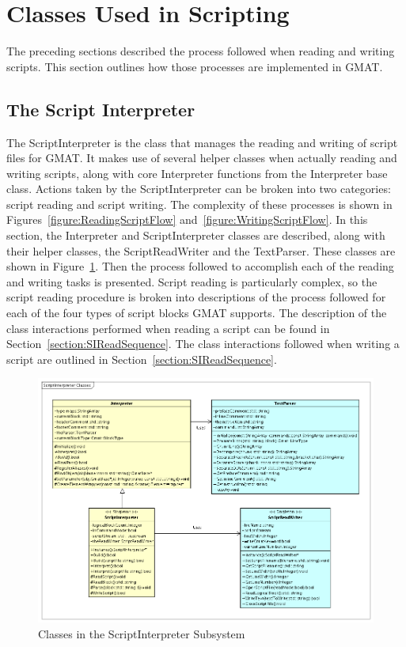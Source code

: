 \section{\label{section:ScriptClasses}Classes Used in Scripting}

The preceding sections described the process followed when reading and writing scripts.  This
section outlines how those processes are implemented in GMAT.

\subsection{\label{section:ScriptInterpreter}The Script Interpreter}

The ScriptInterpreter is the class that manages the reading and writing of script files for GMAT.
It makes use of several helper classes when actually reading and writing scripts, along with core
Interpreter functions from the Interpreter base class.  Actions taken by the ScriptInterpreter can
be broken into two categories: script reading and script writing.  The complexity of these processes
is shown in Figures~\ref{figure:ReadingScriptFlow} and~\ref{figure:WritingScriptFlow}.  In this
section, the Interpreter and ScriptInterpreter classes are described, along with their helper
classes, the ScriptReadWriter and the TextParser.  These classes are shown in
Figure~\ref{figure:ScriptInterpreterClasses}.  Then the process followed to accomplish each of the
reading and writing tasks is presented. Script reading is particularly complex, so the script
reading procedure is broken into descriptions of the process followed for each of the four types of
script blocks GMAT supports.  The description of the class interactions performed when reading a
script can be found in Section~\ref{section:SIReadSequence}. The class interactions followed when
writing a script are outlined in Section~\ref{section:SIReadSequence}.

\begin{figure}[htb]
\begin{center}
\includegraphics[400,292]{Images/ScriptInterpreterClasses.png}
\caption{\label{figure:ScriptInterpreterClasses}Classes in the ScriptInterpreter Subsystem}
\end{center}
\end{figure}

